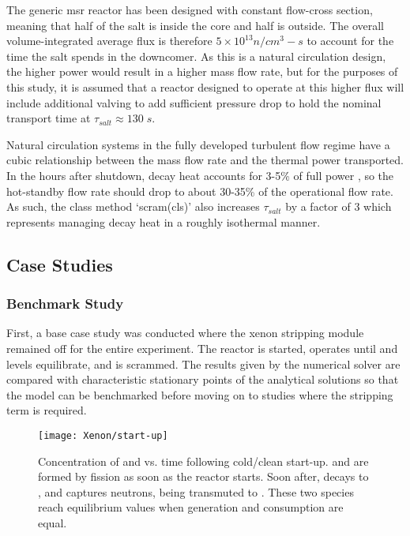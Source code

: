 The generic \acs{msr} reactor has been designed with constant flow-cross section, meaning that half of the salt is inside the core and half is outside. The overall volume-integrated average flux is therefore $5\times 10^{13} n/cm^3-s$ to account for the time the salt spends in the downcomer. As this is a natural circulation design, the higher power would result in a higher mass flow rate, but for the purposes of this study, it is assumed that a reactor designed to operate at this higher flux will include additional valving to add sufficient pressure drop to hold the nominal transport time at $\tau_{salt} \approx 130\; s$.

Natural circulation systems in the fully developed turbulent flow regime have a cubic relationship between the mass flow rate and the thermal power transported\cite[Ch. 3]{TodreasKazimi2}. In the hours after shutdown, decay heat accounts for 3-5\% of full power \cite[Ch. 3]{TodreasKazimi1}, so the hot-standby flow rate should drop to about 30-35\% of the operational flow rate. As such, the class method `scram(cls)' also increases $\tau_{salt}$ by a factor of 3 which represents managing decay heat in a roughly isothermal manner.



\subsection{Case Studies}
\subsubsection{Benchmark Study}

First, a base case study was conducted where the xenon stripping module remained off for the entire experiment. The reactor is started, operates until \I and \Xe levels equilibrate, and is scrammed. The results given by the numerical solver are compared with characteristic stationary points of the analytical solutions so that the model can be benchmarked before moving on to studies where the stripping term is required.

\begin{figure}[b!]
    \centering
    \texttt{[image: Xenon/start-up]}
    \caption[Concentration of \I and \Xe vs. time following start-up]{Concentration of \I and \Xe vs. time following cold/clean start-up. \I and \Xe are formed by fission as soon as the reactor starts. Soon after, \I decays to \Xe, and \Xe captures neutrons, being transmuted to \Xe[136]. These two species reach equilibrium values when generation and consumption are equal.}
    \label{fig:startup}
\end{figure}

